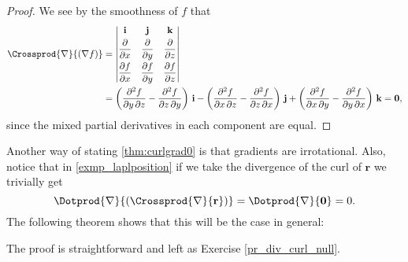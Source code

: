 
\begin{proof}
 We see by the smoothness of $f$ that
 \begin{align*}
  \Crossprod{\nabla}{(\nabla f)} &= \begin{vmatrix}
   \textbf{i} & \textbf{j} & \textbf{k} \vspace{1mm}\\ \dfrac{\partial}{\partial x} & \dfrac{\partial}{\partial y} &
    \dfrac{\partial}{\partial z} \vspace{1mm}\\
   \dfrac{\partial f}{\partial x} & \dfrac{\partial f}{\partial y} & \dfrac{\partial f}{\partial z}
   \end{vmatrix}\\
  &= \left( \frac{\partial^2 f}{\partial y\,\partial z}-\frac{\partial^2 f}{\partial z\,\partial y} \right) \,\textbf{i}
   - \left( \frac{\partial^2 f}{\partial x\,\partial z}-\frac{\partial^2 f}{\partial z\,\partial x} \right) \,\textbf{j}
   + \left( \frac{\partial^2 f}{\partial x\,\partial y}-\frac{\partial^2 f}{\partial y\,\partial x} \right) \,\textbf{k}
  = \textbf{0} ,
 \end{align*}
 since the mixed partial derivatives in each component are equal.
\end{proof}


Another way of stating \autoref{thm:curlgrad0} is that gradients are irrotational. Also, notice that in \autoref{exmp_laplposition} if we take the divergence of the curl of $\textbf{r}$ we trivially get
\[
 \Dotprod{\nabla}{(\Crossprod{\nabla}{\textbf{r}})} = \Dotprod{\nabla}{\textbf{0}} = 0 .
\]
The following theorem shows that this will be the case in general:


The proof is straightforward and left as Exercise \ref{pr_div_curl_null}.


